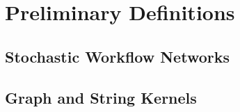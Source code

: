 \section{Preliminary Definitions}
\subsection{Stochastic Workflow Networks}

\subsection{Graph and String Kernels}

